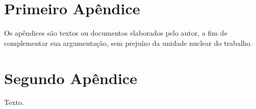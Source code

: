 \begin{apendicesenv}


\chapter*{Primeiro Apêndice}
\label{sec:apendicea}

Os apêndices são textos ou documentos elaborados pelo autor, a fim de complementar sua argumentação, sem prejuízo da unidade nuclear do trabalho.

\chapter*{Segundo Apêndice}
\label{sec:apendiceb}

Texto.



\end{apendicesenv}

